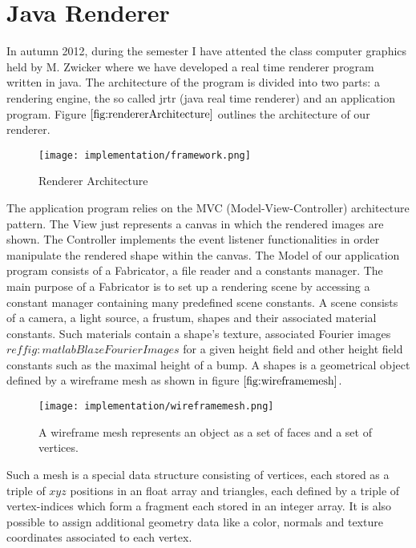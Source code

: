 \section{Java Renderer}
In autumn 2012, during the semester I have attented the class computer graphics held by M. Zwicker where we have developed a real time renderer program written in java. The architecture of the program is divided into two parts: a rendering engine, the so called jrtr (java real time renderer) and an application program. Figure $\ref{fig:rendererArchitecture}$ outlines the architecture of our renderer. 

\begin{figure}[H]
  \centering
  \texttt{[image: implementation/framework.png]}
  \caption{Renderer Architecture}
  \label{fig:rendererArchitecture}
\end{figure}

The application program relies on the MVC (Model-View-Controller) architecture pattern. The View just represents a canvas in which the rendered images are shown. The Controller implements the event listener functionalities in order manipulate the rendered shape within the canvas. The Model of our application program consists of a Fabricator, a file reader and a constants manager. The main purpose of a Fabricator is to set up a rendering scene by accessing a constant manager containing many predefined scene constants. A scene consists of a camera, a light source, a frustum, shapes and their associated material constants. Such materials contain a shape's texture, associated Fourier images $ref{fig:matlabBlazeFourierImages}$ for a given height field and other height field constants such as the maximal height of a bump. A shapes is a geometrical object defined by a wireframe mesh as shown in figure $\ref{fig:wireframemesh}$. 

\begin{figure}[H]
  \centering
  \texttt{[image: implementation/wireframemesh.png]}
  \caption{A wireframe mesh represents an object as a set of faces and a set of vertices.}
  \label{fig:wireframemesh}
\end{figure}

Such a mesh is a special data structure consisting of vertices, each stored as a triple of $xyz$ positions in an float array and triangles, each defined by a triple of vertex-indices which form a fragment each stored in an integer array. It is also possible to assign additional geometry data like a color, normals and texture coordinates associated to each vertex. \\

